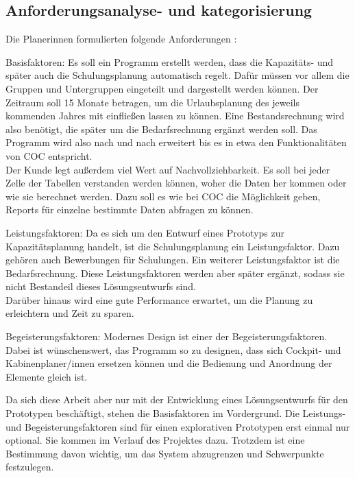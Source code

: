 \documentclass [12pt, a4paper, oneside, titlepage, ngerman]{article}
\begin{document}
\subsection{Anforderungsanalyse- und kategorisierung}
Die Planerinnen formulierten folgende Anforderungen \cite[vgl.]{Gespraech2}:
\begin{description}
\item Basisfaktoren: Es soll ein Programm erstellt werden, dass die Kapazitäts- und später auch die Schulungsplanung automatisch regelt. Dafür müssen vor allem die Gruppen und Untergruppen eingeteilt und dargestellt werden können. Der Zeitraum soll 15 Monate betragen, um die Urlaubsplanung des jeweils kommenden Jahres mit einfließen lassen zu können. Eine Bestandsrechnung wird also benötigt, die später um die Bedarfsrechnung ergänzt werden soll. Das Programm wird also nach und nach erweitert bis es in etwa den Funktionalitäten von \ac{COC} entspricht. \\
Der Kunde legt außerdem viel Wert auf Nachvollziehbarkeit. Es soll bei jeder Zelle der Tabellen verstanden werden können, woher die Daten her kommen oder wie sie berechnet werden. Dazu soll es wie bei \ac{COC} die Möglichkeit geben, Reports für einzelne bestimmte Daten abfragen zu können. %
\item Leistungsfaktoren: Da es sich um den Entwurf eines Prototyps zur Kapazitätsplanung handelt, ist die Schulungsplanung ein Leistungsfaktor. Dazu gehören auch Bewerbungen für Schulungen. Ein weiterer Leistungsfaktor ist die Bedarfsrechnung. Diese Leistungsfaktoren werden aber später ergänzt, sodass sie nicht Bestandeil dieses Lösungsentwurfs sind. \\
Darüber hinaus wird eine gute Performance erwartet, um die Planung zu erleichtern und Zeit zu sparen.
\item Begeisterungsfaktoren: Modernes Design ist einer der Begeisterungsfaktoren. Dabei ist wünschenswert, das Programm so zu designen, dass sich Cockpit- und Kabinenplaner/innen ersetzen können und die Bedienung und Anordnung der Elemente gleich ist. 
\end{description}
Da sich diese Arbeit aber nur mit der Entwicklung eines Lösungsentwurfs für den Prototypen beschäftigt, stehen die Basisfaktoren im Vordergrund. Die Leistungs- und Begeisterungsfaktoren sind für einen explorativen Prototypen erst einmal nur optional. Sie kommen im Verlauf des Projektes dazu. Trotzdem ist eine Bestimmung davon wichtig, um das System abzugrenzen und Schwerpunkte festzulegen.
\end{document}
